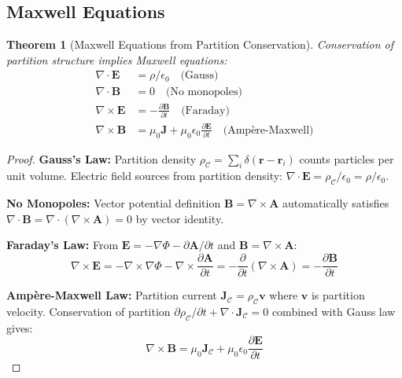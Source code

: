 \documentclass[twocolumn,10pt]{article}
\newtheorem{theorem}{Theorem}[section]
\begin{document}
\subsection{Maxwell Equations}

\begin{theorem}[Maxwell Equations from Partition Conservation]
\label{thm:maxwell_equations}
Conservation of partition structure implies Maxwell equations:
\begin{align}
\nabla \cdot \mathbf{E} &= \rho/\epsilon_0 \quad \text{(Gauss)} \\
\nabla \cdot \mathbf{B} &= 0 \quad \text{(No monopoles)} \\
\nabla \times \mathbf{E} &= -\frac{\partial \mathbf{B}}{\partial t} \quad \text{(Faraday)} \\
\nabla \times \mathbf{B} &= \mu_0 \mathbf{J} + \mu_0\epsilon_0 \frac{\partial \mathbf{E}}{\partial t} \quad \text{(Amp\`ere-Maxwell)}
\end{align}
\end{theorem}

\begin{proof}
\textbf{Gauss's Law:} Partition density $\rho_{\mathcal{C}} = \sum_i \delta(\mathbf{r} - \mathbf{r}_i)$ counts particles per unit volume. Electric field sources from partition density: $\nabla \cdot \mathbf{E} = \rho_{\mathcal{C}}/\epsilon_0 = \rho/\epsilon_0$.

\textbf{No Monopoles:} Vector potential definition $\mathbf{B} = \nabla \times \mathbf{A}$ automatically satisfies $\nabla \cdot \mathbf{B} = \nabla \cdot (\nabla \times \mathbf{A}) = 0$ by vector identity.

\textbf{Faraday's Law:} From $\mathbf{E} = -\nabla\Phi - \partial \mathbf{A}/\partial t$ and $\mathbf{B} = \nabla \times \mathbf{A}$:
\begin{equation}
\nabla \times \mathbf{E} = -\nabla \times \nabla\Phi - \nabla \times \frac{\partial \mathbf{A}}{\partial t} = -\frac{\partial}{\partial t}(\nabla \times \mathbf{A}) = -\frac{\partial \mathbf{B}}{\partial t}
\end{equation}

\textbf{Amp\`ere-Maxwell Law:} Partition current $\mathbf{J}_{\mathcal{C}} = \rho_{\mathcal{C}} \mathbf{v}$ where $\mathbf{v}$ is partition velocity. Conservation of partition $\partial \rho_{\mathcal{C}}/\partial t + \nabla \cdot \mathbf{J}_{\mathcal{C}} = 0$ combined with Gauss law gives:
\begin{equation}
\nabla \times \mathbf{B} = \mu_0 \mathbf{J}_{\mathcal{C}} + \mu_0\epsilon_0 \frac{\partial \mathbf{E}}{\partial t}
\end{equation}
\end{proof}
\end{document}
